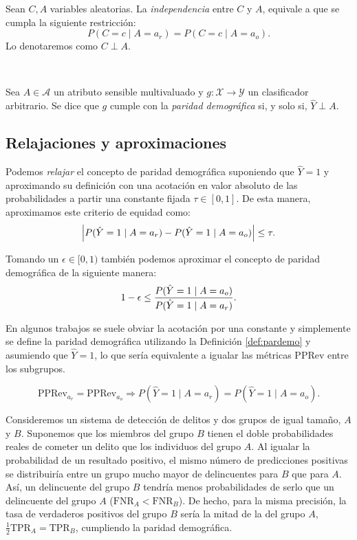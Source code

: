 \documentclass[oneside,openright,titlepage,numbers=noenddot,openany,headinclude,footinclude=true,
cleardoublepage=empty,abstractoff,BCOR=5mm,paper=a4,fontsize=12pt,main=spanish]{scrreprt}
\begin{document}
\begin{definition}
Sean $C,A$ variables aleatorias. La \textit{independencia} entre $C$ y $A$, equivale a que se cumpla la siguiente restricción:
$$P(C=c \mid A=a_r)=P(C=c \mid A=a_o).$$
Lo denotaremos como $C \perp A.$
\end{definition}\

\begin{definition} \label{def:pardemo}
Sea $A \in \mathcal{A}$ un atributo sensible multivaluado y $g\colon \mathcal{X} \to \mathcal{Y}$ un clasificador arbitrario. Se dice que $g$ cumple con la \textit{paridad demográfica} si, y solo si, $\hat{Y} \perp A.$
\end{definition}

\subsection*{Relajaciones y aproximaciones}

Podemos \textit{relajar} el concepto de paridad demográfica suponiendo que $\hat{Y}=1$ y aproximando su definición con una acotación en valor absoluto de las probabilidades a partir una constante fijada $\tau \in [0,1]$. De esta manera, aproximamos este criterio de equidad como: 
\begin{equation*}
\left\lvert P(\hat{Y}=1 \mid A=a_r)-P(\hat{Y}=1 \mid A=a_o)\right\rvert \leq \tau.
\end{equation*}

Tomando un $\epsilon \in [0,1)$ también podemos aproximar el concepto de paridad demográfica de la siguiente manera:
\begin{equation*}\label{eq:p}
   1-\epsilon \leq \frac{\displaystyle P(\hat{Y}=1 \mid A=a_o)}{\displaystyle P(\hat{Y}=1 \mid A=a_r)}. 
\end{equation*}

En algunos trabajos se suele obviar la acotación por una constante y simplemente se define la paridad demográfica utilizando la Definición \ref{def:pardemo} y asumiendo que $\hat{Y}=1$, lo que sería equivalente a igualar las métricas PPRev entre los subgrupos.

\begin{equation*}
\text{PPRev}_{a_r}=\text{PPRev}_{a_o} \Rightarrow P(\hat{Y}=1 \mid A=a_r)=P(\hat{Y}=1 \mid A=a_o).
\end{equation*}

\begin{example}
Consideremos un sistema de detección de delitos y dos grupos de igual tamaño, $A$ y $B$. Suponemos que los miembros del grupo $B$ tienen el doble probabilidades reales de cometer un delito que los individuos del grupo $A$. Al igualar la probabilidad de un resultado positivo, el mismo número de predicciones positivas se distribuiría entre un grupo mucho mayor de delincuentes para $B$ que para $A$. Así, un delincuente del grupo $B$ tendría menos probabilidades de serlo que un delincuente del grupo $A$ ($\text{FNR}_A < \text{FNR}_B$). De hecho, para la misma precisión, la tasa de verdaderos positivos del grupo $B$ sería la mitad de la del grupo $A$, $\frac{1}{2} \text{TPR}_A = \text{TPR}_B$, cumpliendo la paridad demográfica.
\end{example}
\end{document}
